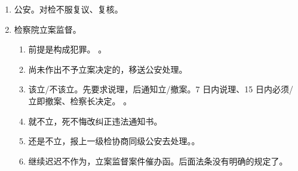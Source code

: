 \begin{enumerate}
\begin{enumerate}
\begin{enumerate}
                \end{enumerate}
          \item 初查 = 初步调查核实 \bdy 侦查。温柔的手段。不限制人身、财产权利的任意性措施。
                \begin{enumerate}
                  \item {}。
                  \item {}。
                \end{enumerate}
          \item 书面决定立案 \hz 不立案 \yjt 告知原因（）。
          \item 立案后撤案。
                \begin{enumerate}
                  \item 一般撤案。法定不追责 + 无罪均撤案。
                  \item 特殊撤案。如实供、大立功、最高检核。其实就是认罪认罚免于刑事处罚的条件。
                  \item 终止侦查。并非他所为、共犯不处罚。
                  \item 救济。只能公转自。不要和不立案救济混。！！
                \end{enumerate}
        \end{enumerate}
  \item 公安。对检不服复议、复核。
  \item 检察院立案监督。
        \begin{enumerate}
          \item 前提是构成犯罪。 。
          \item 尚未作出不予立案决定的，移送公安处理。
          \item 该立/不该立。先要求说理，后通知立/撤案。7 日内说理、15 日内必须/立即撤案、检察长决定。
                。
          \item 就不立，死不悔改纠正违法通知书。
          \item 还是不立，报上一级检协商同级公安去处理。。
          \item 继续迟迟不作为，立案监督案件催办函。后面法条没有明确的规定了。
        \end{enumerate}
\end{enumerate}
